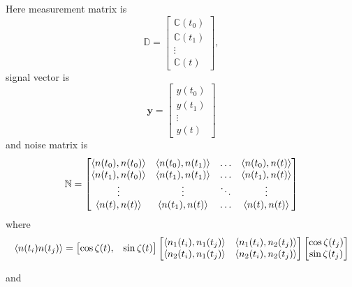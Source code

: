 Here measurement matrix is
\begin{equation}
 \mathbb{D} = 
\begin{bmatrix}
 \mathbb{C}(t_0) \\
 \mathbb{C}(t_1) \\
 \vdots\\
 \mathbb{C}(t)
\end{bmatrix},
\end{equation}
signal vector is
\begin{equation}
 \mathbf{y} = 
\begin{bmatrix}
 y(t_0)\\
 y(t_1)\\
\vdots\\
y(t)
\end{bmatrix}
\end{equation}
and noise matrix is
\begin{equation}
 \mathbb{N} = 
\begin{bmatrix}
 \langle n(t_0),n(t_0)\rangle & \langle n(t_0),n(t_1)\rangle & \hdots & \langle n(t_0),n(t)\rangle \\
\langle n(t_1),n(t_0)\rangle & \langle n(t_1),n(t_1)\rangle & \hdots & \langle n(t_1),n(t)\rangle \\
\vdots & \vdots & \ddots & \vdots \\
\langle n(t),n(t)\rangle & \langle n(t_1),n(t)\rangle & \hdots & \langle n(t),n(t)\rangle \\
\end{bmatrix}
\end{equation}
where
\begin{equation}
 \langle n(t_i)n(t_j)\rangle = 
\begin{bmatrix}
 \cos\zeta(t), & \sin\zeta(t)
\end{bmatrix}
\begin{bmatrix}
 \langle n_1(t_i),n_1(t_j)\rangle & \langle n_1(t_i),n_2(t_j)\rangle\\
 \langle n_2(t_i),n_1(t_j)\rangle & \langle n_2(t_i),n_2(t_j)\rangle
\end{bmatrix}
\begin{bmatrix}
 \cos\zeta(t_j)\\ \sin\zeta(t_j)
\end{bmatrix}
\end{equation}

and

